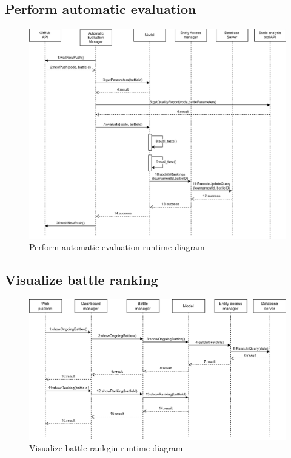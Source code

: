 \subsection*{Perform automatic evaluation}
\begin{figure}[h]
    \centering
    \includegraphics[width=\textwidth]{images/runtime/evalA.png}
    \caption{Perform automatic evaluation runtime diagram}
    \label{fig:rt-evalA}
\end{figure}
\clearpage

\subsection*{Visualize battle ranking}
\begin{figure}[h]
    \centering
    \includegraphics[width=\textwidth]{images/runtime/battleRank.png}
    \caption{Visualize battle rankgin runtime diagram}
    \label{fig:rt-battleRank}
\end{figure}

